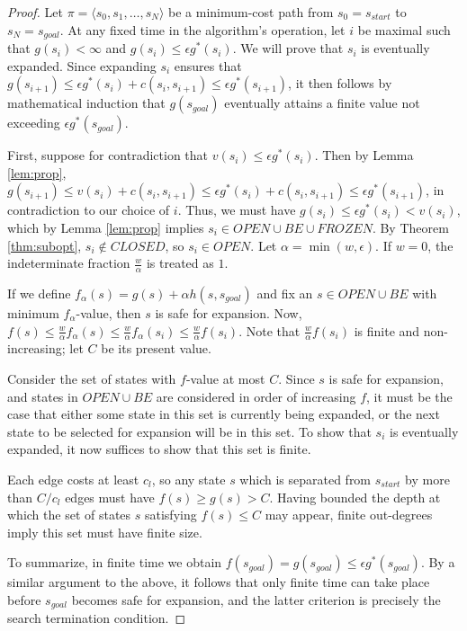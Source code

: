 \documentclass[letterpaper]{article}
\begin{document}
\begin{proof}

Let $\pi = \langle s_0,s_1,\ldots,s_N \rangle$ be a minimum-cost path from $s_0 = s_{start}$ to $s_N = s_{goal}$. At any fixed time in the algorithm's operation, let $i$ be maximal such that $g(s_i)<\infty$ and $g(s_i)\le\epsilon g^*(s_i)$. We will prove that $s_i$ is eventually expanded. Since expanding $s_i$ ensures that $g(s_{i+1})\le \epsilon g^*(s_i)+c(s_i,s_{i+1})\le\epsilon g^*(s_{i+1})$, it then follows by mathematical induction that $g(s_{goal})$ eventually attains a finite value not exceeding $\epsilon g^*(s_{goal})$.

First, suppose for contradiction that $v(s_i)\le \epsilon g^*(s_i)$. Then by Lemma \ref{lem:prop}, $g(s_{i+1}) \le v(s_i)+c(s_i,s_{i+1})\le\epsilon g^*(s_i)+c(s_i,s_{i+1})\le\epsilon g^*(s_{i+1})$, in contradiction to our choice of $i$. Thus, we must have $g(s_i)\le\epsilon g^*(s_i)<v(s_i)$, which by Lemma \ref{lem:prop} implies $s_i\in OPEN\cup BE\cup FROZEN$. By Theorem \ref{thm:subopt}, $s_i\notin CLOSED$, so $s_i\in OPEN$. Let $\alpha = \min(w,\epsilon)$. If $w=0$, the indeterminate fraction $\frac w\alpha$ is treated as $1$.

If we define $f_\alpha(s) = g(s) + \alpha h(s,s_{goal})$ and fix an $s\in OPEN\cup BE$ with minimum $f_\alpha$-value, then $s$ is safe for expansion. Now, $f(s) \le \frac w\alpha f_\alpha(s) \le \frac w\alpha f_\alpha(s_i) \le \frac w\alpha f(s_i)$. Note that $\frac w\alpha f(s_i)$ is finite and non-increasing; let $C$ be its present value.

Consider the set of states with $f$-value at most $C$. Since $s$ is safe for expansion, and states in $OPEN\cup BE$ are considered in order of increasing $f$, it must be the case that either some state in this set is currently being expanded,  or the next state to be selected for expansion will be in this set. To show that $s_i$ is eventually expanded, it now suffices to show that this set is finite.

Each edge costs at least $c_l$, so any state $s$ which is separated from $s_{start}$ by more than $C/c_l$ edges must have $f(s) \ge g(s) > C$. Having bounded the depth at which the set of states $s$ satisfying $f(s) \le C$ may appear, finite out-degrees imply this set must have finite size.

To summarize, in finite time we obtain $f(s_{goal}) = g(s_{goal}) \le \epsilon g^*(s_{goal})$. By a similar argument to the above, it follows that only finite time can take place before $s_{goal}$ becomes safe for expansion, and the latter criterion is precisely the search termination condition.
\end{proof}
\end{document}
